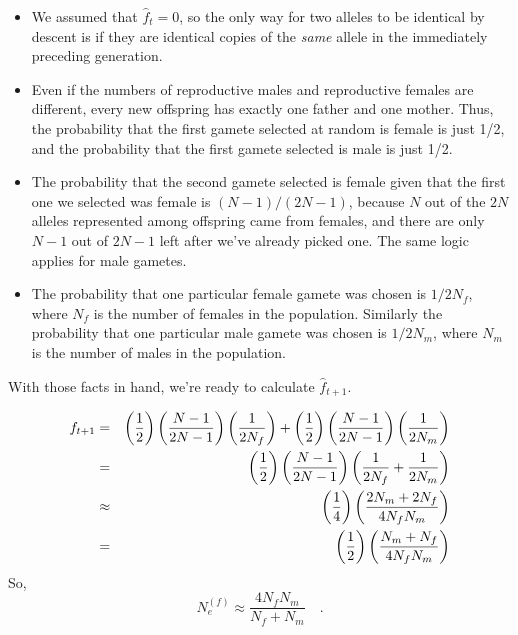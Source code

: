 \begin{itemize}

\item We assumed that $\hat f_t = 0$, so the only way for two alleles
to be identical by descent is if they are identical copies of the {\it
same\/} allele in the immediately preceding generation.

\item Even if the numbers of reproductive males and reproductive
  females are different, every new offspring has exactly one father
  and one mother. Thus, the probability that the first gamete selected
  at random is female is just 1/2, and the probability that the first
  gamete selected is male is just 1/2.

\item The probability that the second gamete selected is female given
  that the first one we selected was female is $(N-1)/(2N-1)$, because
  $N$ out of the $2N$ alleles represented among offspring came from
  females, and there are only $N-1$ out of $2N-1$ left after we've
  already picked one. The same logic applies for male gametes.

\item The probability that one particular female gamete was chosen is
  $1/2N_f$, where $N_f$ is the number of females in the
  population. Similarly the probability that one particular male
  gamete was chosen is $1/2N_m$, where $N_m$ is the number of males in
  the population.

\end{itemize}

\noindent With those facts in hand, we're ready to calculate $\hat
f_{t+1}$.

\begin{eqnarray*}
f_{t+1} &=& \left(\frac{1}{2}\right) \left(\frac{N-1}{2N-1}\right)
            \left(\frac{1}{2N_f}\right) +
            \left(\frac{1}{2}\right) \left(\frac{N-1}{2N-1}\right)
            \left(\frac{1}{2N_m}\right) \\
        &=& \left(\frac{1}{2}\right) \left(\frac{N-1}{2N-1}\right)
            \left(\frac{1}{2N_f} + \frac{1}{2N_m}\right) \\
        &\approx& \left(\frac{1}{4}\right)
            \left(\frac{2N_m + 2N_f}{4N_fN_m}\right) \\
        &=& \left(\frac{1}{2}\right)
            \left(\frac{N_m + N_f}{4N_fN_m}\right)
\end{eqnarray*}
So,
\[
N_e^{(f)} \approx \frac{4N_fN_m}{N_f + N_m} \quad .
\]

